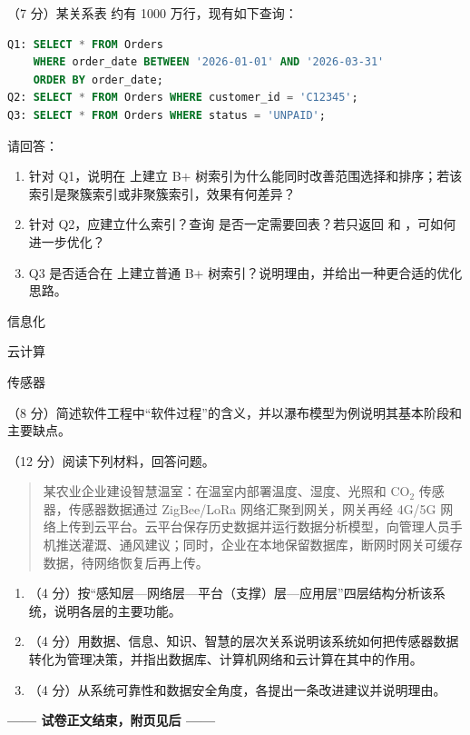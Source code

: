 \documentclass[a4paper,11pt]{article}
\begin{document}
\q （7 分）某关系表  约有 1000 万行，现有如下查询：
\begin{lstlisting}[language=SQL]
Q1: SELECT * FROM Orders
    WHERE order_date BETWEEN '2026-01-01' AND '2026-03-31'
    ORDER BY order_date;
Q2: SELECT * FROM Orders WHERE customer_id = 'C12345';
Q3: SELECT * FROM Orders WHERE status = 'UNPAID';
\end{lstlisting}
请回答：
\begin{enumerate}[label=（\arabic*）, leftmargin=2.4em, itemsep=1pt]
  \item 针对 Q1，说明在  上建立 B+ 树索引为什么能同时改善范围选择和排序；若该索引是聚簇索引或非聚簇索引，效果有何差异？
  \item 针对 Q2，应建立什么索引？查询  是否一定需要回表？若只返回  和 ，可如何进一步优化？
  \item Q3 是否适合在  上建立普通 B+ 树索引？说明理由，并给出一种更合适的优化思路。
\end{enumerate}
\anslines{7cm}



\q 信息化
\anslines{3cm}

\q 云计算
\anslines{3cm}

\q 传感器
\anslines{3cm}


\q （8 分）简述软件工程中“软件过程”的含义，并以瀑布模型为例说明其基本阶段和主要缺点。
\anslines{5.5cm}


\q （12 分）阅读下列材料，回答问题。
\begin{quote}\small
某农业企业建设智慧温室：在温室内部署温度、湿度、光照和 CO$_2$ 传感器，传感器数据通过 ZigBee/LoRa 网络汇聚到网关，网关再经 4G/5G 网络上传到云平台。云平台保存历史数据并运行数据分析模型，向管理人员手机推送灌溉、通风建议；同时，企业在本地保留数据库，断网时网关可缓存数据，待网络恢复后再上传。
\end{quote}
\begin{enumerate}[label=（\arabic*）, leftmargin=2.4em, itemsep=1pt]
  \item （4 分）按“感知层—网络层—平台（支撑）层—应用层”四层结构分析该系统，说明各层的主要功能。
  \item （4 分）用数据、信息、知识、智慧的层次关系说明该系统如何把传感器数据转化为管理决策，并指出数据库、计算机网络和云计算在其中的作用。
  \item （4 分）从系统可靠性和数据安全角度，各提出一条改进建议并说明理由。
\end{enumerate}
\anslines{12cm}

\vfill
\begin{center}
\textbf{—— 试卷正文结束，附页见后 ——}
\end{center}

\end{document}
